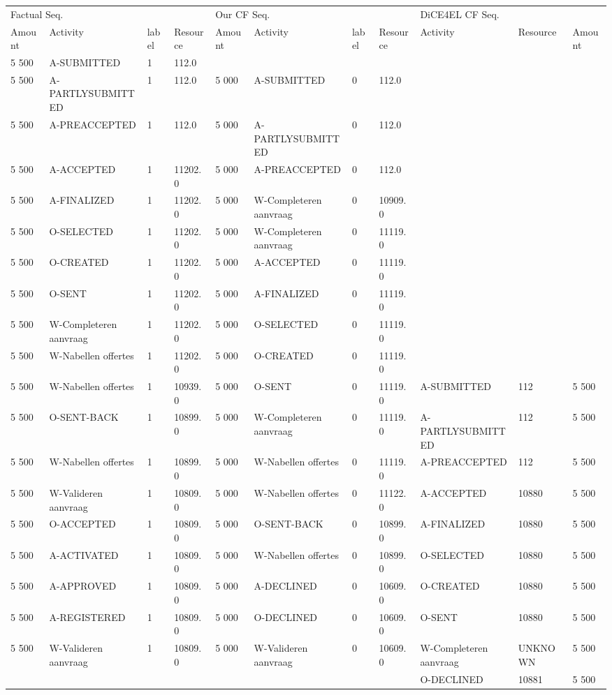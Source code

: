 \begin{tabular}{lllllllllll}
\toprule
\multicolumn{4}{l}{Factual Seq.} & \multicolumn{4}{l}{Our CF Seq.} & \multicolumn{3}{l}{DiCE4EL CF Seq.} \\
Amount & Activity & label & Resource & Amount & Activity & label & Resource & Activity & Resource & Amount \\
\midrule
5 500 & A-SUBMITTED & 1 & 112.0 &  &  &  &  &  &  &  \\
5 500 & A-PARTLYSUBMITTED & 1 & 112.0 & 5 000 & A-SUBMITTED & 0 & 112.0 &  &  &  \\
5 500 & A-PREACCEPTED & 1 & 112.0 & 5 000 & A-PARTLYSUBMITTED & 0 & 112.0 &  &  &  \\
5 500 & A-ACCEPTED & 1 & 11202.0 & 5 000 & A-PREACCEPTED & 0 & 112.0 &  &  &  \\
5 500 & A-FINALIZED & 1 & 11202.0 & 5 000 & W-Completeren aanvraag & 0 & 10909.0 &  &  &  \\
5 500 & O-SELECTED & 1 & 11202.0 & 5 000 & W-Completeren aanvraag & 0 & 11119.0 &  &  &  \\
5 500 & O-CREATED & 1 & 11202.0 & 5 000 & A-ACCEPTED & 0 & 11119.0 &  &  &  \\
5 500 & O-SENT & 1 & 11202.0 & 5 000 & A-FINALIZED & 0 & 11119.0 &  &  &  \\
5 500 & W-Completeren aanvraag & 1 & 11202.0 & 5 000 & O-SELECTED & 0 & 11119.0 &  &  &  \\
5 500 & W-Nabellen offertes & 1 & 11202.0 & 5 000 & O-CREATED & 0 & 11119.0 &  &  &  \\
5 500 & W-Nabellen offertes & 1 & 10939.0 & 5 000 & O-SENT & 0 & 11119.0 & A-SUBMITTED & 112 & 5 500 \\
5 500 & O-SENT-BACK & 1 & 10899.0 & 5 000 & W-Completeren aanvraag & 0 & 11119.0 & A-PARTLYSUBMITTED & 112 & 5 500 \\
5 500 & W-Nabellen offertes & 1 & 10899.0 & 5 000 & W-Nabellen offertes & 0 & 11119.0 & A-PREACCEPTED & 112 & 5 500 \\
5 500 & W-Valideren aanvraag & 1 & 10809.0 & 5 000 & W-Nabellen offertes & 0 & 11122.0 & A-ACCEPTED & 10880 & 5 500 \\
5 500 & O-ACCEPTED & 1 & 10809.0 & 5 000 & O-SENT-BACK & 0 & 10899.0 & A-FINALIZED & 10880 & 5 500 \\
5 500 & A-ACTIVATED & 1 & 10809.0 & 5 000 & W-Nabellen offertes & 0 & 10899.0 & O-SELECTED & 10880 & 5 500 \\
5 500 & A-APPROVED & 1 & 10809.0 & 5 000 & A-DECLINED & 0 & 10609.0 & O-CREATED & 10880 & 5 500 \\
5 500 & A-REGISTERED & 1 & 10809.0 & 5 000 & O-DECLINED & 0 & 10609.0 & O-SENT & 10880 & 5 500 \\
5 500 & W-Valideren aanvraag & 1 & 10809.0 & 5 000 & W-Valideren aanvraag & 0 & 10609.0 & W-Completeren aanvraag & UNKNOWN & 5 500 \\
 &  &  &  &  &  &  &  & O-DECLINED & 10881 & 5 500 \\
\bottomrule
\end{tabular}
